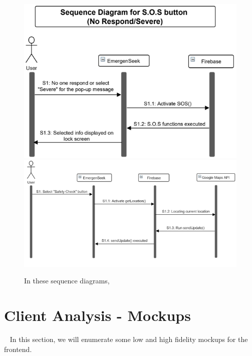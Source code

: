 \documentclass[10pt, a4paper]{article}
\begin{document}
\begin{figure}[H]
{  	\includegraphics[scale=0.6]{diagrams/sequence-5c.png}
  	\includegraphics[scale=0.6]{diagrams/sequence-5d.png}
   } 
  \caption{In these sequence diagrams,}
\end{figure}

\section{Client Analysis - Mockups}
\par ~ In this section, we will enumerate some low and high fidelity mockups for the frontend.
\end{document}
